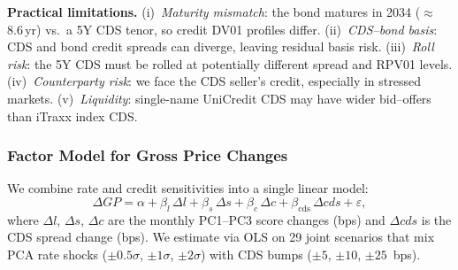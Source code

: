 \documentclass[11pt,a4paper]{article}
\begin{document}
\noindent\textbf{Practical limitations.}\quad
(i)~\emph{Maturity mismatch}: the bond matures in 2034 ($\approx$8.6\,yr)
vs.\ a 5Y CDS tenor, so credit DV01 profiles differ.
(ii)~\emph{CDS--bond basis}: CDS and bond credit spreads can
diverge, leaving residual basis risk.
(iii)~\emph{Roll risk}: the 5Y CDS must be rolled at potentially
different spread and RPV01 levels.
(iv)~\emph{Counterparty risk}: we face the CDS seller's credit,
especially in stressed markets.
(v)~\emph{Liquidity}: single-name UniCredit CDS may have wider
bid--offers than iTraxx index CDS.

\subsubsection{Factor Model for Gross Price Changes}
\label{sssec:q17_factor_model}

We combine rate and credit sensitivities into a single linear model:
\begin{equation}
  \Delta GP
  = \alpha
  + \beta_l \,\Delta l
  + \beta_s \,\Delta s
  + \beta_c \,\Delta c
  + \beta_{\text{cds}} \,\Delta\mathit{cds}
  + \varepsilon,
  \label{eq:q17_factor_model}
\end{equation}
where $\Delta l$, $\Delta s$, $\Delta c$ are the monthly PC1--PC3
score changes (bps) and $\Delta\mathit{cds}$ is the CDS spread
change (bps).  We estimate via OLS on 29 joint scenarios that mix
PCA rate shocks ($\pm 0.5\sigma$, $\pm 1\sigma$, $\pm 2\sigma$)
with CDS bumps ($\pm 5$, $\pm 10$, $\pm 25$~bps).
\end{document}
